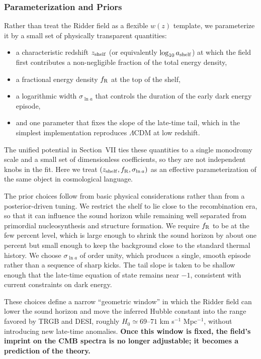\documentclass[a4paper,11pt]{article}
\begin{document}
\subsubsection{Parameterization and Priors}

Rather than treat the Ridder field as a flexible $w(z)$ template, we parameterize it by a small set of physically transparent quantities:
\begin{itemize}
    \item a characteristic redshift $z_{\rm shelf}$ (or equivalently $\log_{10} a_{\rm shelf}$) at which the field first contributes a non-negligible fraction of the total energy density,
    \item a fractional energy density $f_{\rm R}$ at the top of the shelf,
    \item a logarithmic width $\sigma_{\ln a}$ that controls the duration of the early dark energy episode,
    \item and one parameter that fixes the slope of the late-time tail, which in the simplest implementation reproduces $\Lambda$CDM at low redshift.
\end{itemize}

The unified potential in Section~VII ties these quantities to a single monodromy scale and a small set of dimensionless coefficients, so they are not independent knobs in the fit. Here we treat $(z_{\rm shelf}, f_{\rm R}, \sigma_{\ln a})$ as an effective parameterization of the same object in cosmological language.

The prior choices follow from basic physical considerations rather than from a posterior-driven tuning. We restrict the shelf to lie close to the recombination era, so that it can influence the sound horizon while remaining well separated from primordial nucleosynthesis and structure formation. We require $f_{\rm R}$ to be at the few percent level, which is large enough to shrink the sound horizon by about one percent but small enough to keep the background close to the standard thermal history. We choose $\sigma_{\ln a}$ of order unity, which produces a single, smooth episode rather than a sequence of sharp kicks. The tail slope is taken to be shallow enough that the late-time equation of state remains near $-1$, consistent with current constraints on dark energy.

These choices define a narrow ``geometric window'' in which the Ridder field can lower the sound horizon and move the inferred Hubble constant into the range favored by TRGB and DESI, roughly $H_{0} \simeq 69$--$71$ km s$^{-1}$ Mpc$^{-1}$, without introducing new late-time anomalies. \textbf{Once this window is fixed, the field's imprint on the CMB spectra is no longer adjustable; it becomes a prediction of the theory.}
\end{document}
